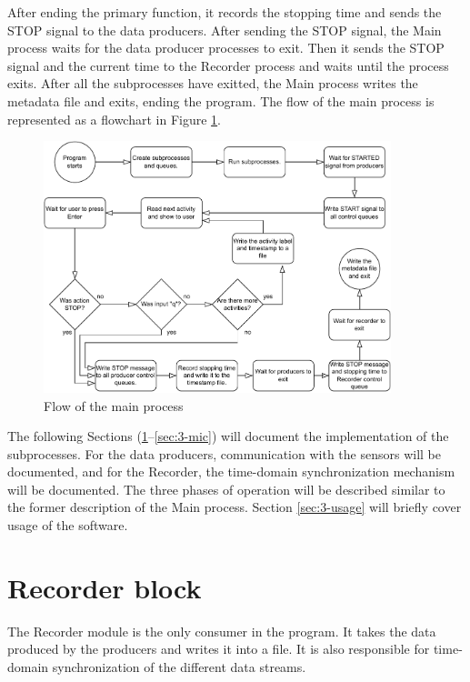After ending the primary function,
it records the stopping time and sends the STOP signal to the data producers.
After sending the STOP signal, the Main process waits for the data producer processes to exit.
Then it sends the STOP signal and the current time to the Recorder process and waits until the process exits.
After all the subprocesses have exitted, the Main process writes the metadata file and exits,
ending the program.
The flow of the main process is represented as a flowchart in Figure \ref{fig:3-main-flowchart}.

\begin{figure}[H]
    \centering
    \includegraphics[width=0.9\textwidth]{fig/3/main-flowchart.pdf}
    \caption{Flow of the main process}
    \label{fig:3-main-flowchart}
\end{figure}

The following Sections (\ref{sec:3-recorder}--\ref{sec:3-mic}) will document the implementation of the subprocesses.
For the data producers, communication with the sensors will be documented, and for the Recorder,
the time-domain synchronization mechanism will be documented.
The three phases of operation will be described similar to the former description of the Main process.
Section \ref{sec:3-usage} will briefly cover usage of the software.

\section{Recorder block}
\label{sec:3-recorder}
The Recorder module is the only consumer in the program.
It takes the data produced by the producers and writes it into a file.
It is also responsible for time-domain synchronization of the different data streams.


